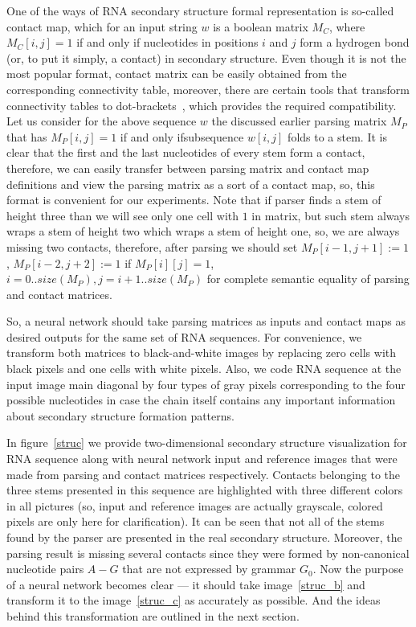 One of the ways of RNA secondary structure formal representation is so-called contact map, which for an input string $w$ is a boolean matrix $M_C$, where $M_C [i,j] = 1$ if and only if nucleotides in positions $i$ and $j$ form a hydrogen bond (or, to put it simply, a contact) in secondary structure. Even though it is not the most popular format, contact matrix can be easily obtained from the corresponding connectivity table, moreover, there are certain tools that transform connectivity tables to dot-brackets~\cite{bellaousov2013rnastructure}, which provides the required compatibility. Let us consider for the above sequence $w$ the discussed earlier parsing matrix $M_P$ that has $M_P[i, j] = 1$ if and only ifsubsequence $w[i, j]$ folds to a stem. It is clear that the first and the last nucleotides of every stem form a contact, therefore, we can easily transfer between parsing matrix and contact map definitions and view the parsing matrix as a sort of a contact map, so, this format is convenient for our experiments. Note that if parser finds a stem of height three than we will see only one cell with $1$ in matrix, but such stem always wraps a stem of height two which wraps a stem of height one, so, we are always missing two contacts, therefore, after parsing we should set $M_P[i - 1, j + 1] := 1$ , $M_P[i - 2, j + 2] := 1$ if $M_P[i][j] = 1$, $i = 0..size(M_P), j = i + 1..size(M_P)$ for complete semantic equality of parsing and contact matrices.

So, a neural network should take parsing matrices as inputs and contact maps as desired outputs for the same set of RNA sequences. For convenience, we transform both matrices to black-and-white images by replacing zero cells with black pixels and one cells with white pixels. Also, we code RNA sequence at the input image main diagonal by four types of gray pixels corresponding to the four possible nucleotides in case the chain itself contains any important information about secondary structure formation patterns.

In figure~\ref{struc} we provide two-dimensional secondary structure visualization for RNA sequence along with neural network input and reference images that were made from parsing and contact matrices respectively. Contacts belonging to the three stems presented in this sequence are highlighted with three different colors in all pictures (so, input and reference images are actually grayscale, colored pixels are only here for clarification). It can be seen that not all of the stems found by the parser are presented in the real secondary structure. Moreover, the parsing result is missing several contacts since they were formed by non-canonical nucleotide pairs $A-G$ that are not expressed by grammar $G_0$. Now the purpose of a neural network becomes clear --- it should take image~\ref{struc_b} and transform it to the image~\ref{struc_c} as accurately as possible. And the ideas behind this transformation are outlined in the next section.

